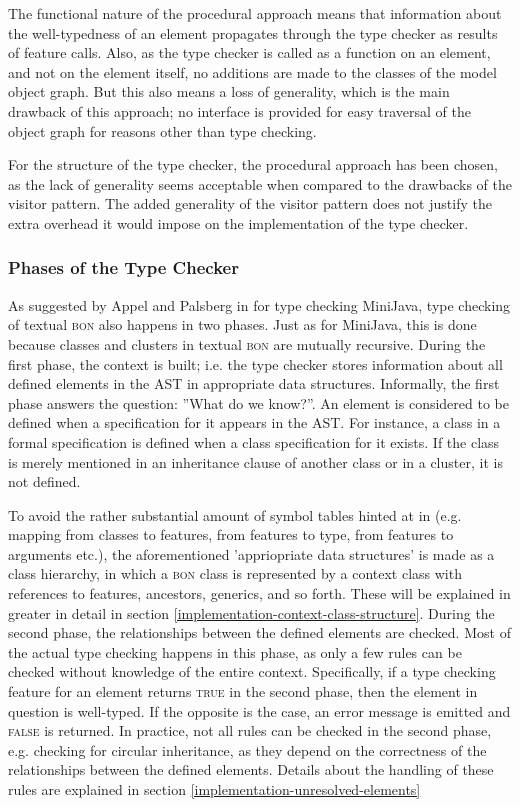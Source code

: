 The functional nature of the procedural approach means that information about the well-typedness of an element propagates through the type checker as results of feature calls. Also, as the type checker is called as a function on an element, and not on the element itself, no additions are made to the classes of the model object graph. But this also means a loss of generality, which is the main drawback of this approach; no interface is provided for easy traversal of the object graph for reasons other than type checking.

For the structure of the type checker, the procedural approach has been chosen, as the lack of generality seems acceptable when compared to the drawbacks of the visitor pattern. The added generality of the visitor pattern does not justify the extra overhead it would impose on the implementation of the type checker.

\subsubsection	{Phases of the Type Checker}
\label{design-phases}
As suggested by Appel and Palsberg in \cite[section~5.2]{appel2004} for type checking MiniJava, type checking of textual \textsc{bon} also happens in two phases. Just as for MiniJava, this is done because classes and clusters in textual \textsc{bon} are mutually recursive.
During the first phase, the context is built; i.e. the type checker stores information about all defined elements in the AST in appropriate data structures. Informally, the first phase answers the question: ''What do we know?''. An element is considered to be defined when a specification for it appears in the AST. For instance, a class in a formal specification is defined when a class specification for it exists. If the class is merely mentioned in an inheritance clause of another class or in a cluster, it is not defined.

To avoid the rather substantial amount of symbol tables hinted at in \cite{appel2004} (e.g. mapping from classes to features, from features to type, from features to arguments etc.), the aforementioned 'appriopriate data structures' is made as a class hierarchy, in which a \textsc{bon} class is represented by a context class with references to features, ancestors, generics, and so forth. These will be explained in greater in detail in section \ref{implementation-context-class-structure}.
During the second phase, the relationships between the defined elements are checked. Most of the actual type checking happens in this phase, as only a few rules can be checked without knowledge of the entire context. Specifically, if a type checking feature for an element returns \textsc{true} in the second phase, then the element in question is well-typed. If the opposite is the case, an error message is emitted and \textsc{false} is returned. In practice, not all rules can be checked in the second phase, e.g. checking for circular inheritance, as they depend on the correctness of the relationships between the defined elements. Details about the handling of these rules are explained in section \ref{implementation-unresolved-elements}

